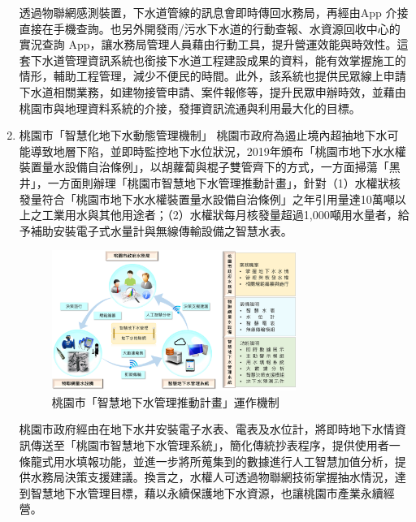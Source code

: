 \documentclass[a4paper,12pt]{article}
\begin{document}
\begin{enumerate}
透過物聯網感測裝置，下水道管線的訊息會即時傳回水務局，再經由App 介接直接在手機查詢。也另外開發雨/污水下水道的行動查報、水資源回收中心的實況查詢 App，讓水務局管理人員藉由行動工具，提升營運效能與時效性。這套下水道管理資訊系統也銜接下水道工程建設成果的資料，能有效掌握施工的情形，輔助工程管理，減少不便民的時間。此外，該系統也提供民眾線上申請下水道相關業務，如建物接管申請、案件報修等，提升民眾申辦時效，並藉由桃園市與地理資料系統的介接，發揮資訊流通與利用最大化的目標。\\
\item 桃園市「智慧化地下水動態管理機制」
\label{sec:org6b65e6f}
桃園市政府為遏止境內超抽地下水可能導致地層下陷，並即時監控地下水位狀況，2019年頒布「桃園市地下水水權裝置量水設備自治條例」，以胡蘿蔔與棍子雙管齊下的方式，一方面掃蕩「黑井」，一方面則辦理「桃園市智慧地下水管理推動計畫」，針對（1）水權狀核發量符合「桃園市地下水水權裝置量水設備自治條例」之年引用量達10萬噸以上之工業用水與其他用途者；（2）水權狀每月核發量超過1,000噸用水量者，給予補助安裝電子式水量計與無線傳輸設備之智慧水表。\\

\begin{figure}[htbp]
\centering
\includegraphics[width=300]{images/aaron3_1png_jpg.png}
\caption{\label{fig:FigName}桃園市「智慧地下水管理推動計畫」運作機制}
\end{figure}

桃園市政府經由在地下水井安裝電子水表、電表及水位計，將即時地下水情資訊傳送至「桃園市智慧地下水管理系統」，簡化傳統抄表程序，提供使用者一條龍式用水填報功能，並進一步將所蒐集到的數據進行人工智慧加值分析，提供水務局決策支援建議。換言之，水權人可透過物聯網技術掌握抽水情況，達到智慧地下水管理目標，藉以永續保護地下水資源，也讓桃園市產業永續經營。\\


\end{enumerate}
\end{document}
